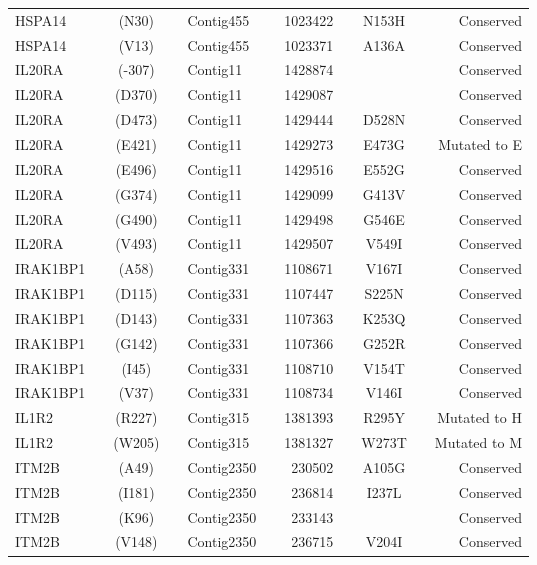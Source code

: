 \begin{center}
\begin{longtable}{lccclcrcccr}
HSPA14   & & (N30)   & & Contig455  & & 1023422  & & N153H   & & Conserved      \\
HSPA14   & & (V13)   & & Contig455  & & 1023371  & & A136A   & & Conserved      \\
IL20RA   & & (-307)  & & Contig11   & & 1428874  & &         & & Conserved      \\
IL20RA   & & (D370)  & & Contig11   & & 1429087  & &         & & Conserved      \\
IL20RA   & & (D473)  & & Contig11   & & 1429444  & & D528N   & & Conserved      \\
IL20RA   & & (E421)  & & Contig11   & & 1429273  & & E473G   & & Mutated to E   \\
IL20RA   & & (E496)  & & Contig11   & & 1429516  & & E552G   & & Conserved      \\
IL20RA   & & (G374)  & & Contig11   & & 1429099  & & G413V   & & Conserved      \\
IL20RA   & & (G490)  & & Contig11   & & 1429498  & & G546E   & & Conserved      \\
IL20RA   & & (V493)  & & Contig11   & & 1429507  & & V549I   & & Conserved      \\
IRAK1BP1 & & (A58)   & & Contig331  & & 1108671  & & V167I   & & Conserved      \\
IRAK1BP1 & & (D115)  & & Contig331  & & 1107447  & & S225N   & & Conserved      \\
IRAK1BP1 & & (D143)  & & Contig331  & & 1107363  & & K253Q   & & Conserved      \\
IRAK1BP1 & & (G142)  & & Contig331  & & 1107366  & & G252R   & & Conserved      \\
IRAK1BP1 & & (I45)   & & Contig331  & & 1108710  & & V154T   & & Conserved      \\
IRAK1BP1 & & (V37)   & & Contig331  & & 1108734  & & V146I   & & Conserved      \\
IL1R2    & & (R227)  & & Contig315  & & 1381393  & & R295Y   & & Mutated to H   \\
IL1R2    & & (W205)  & & Contig315  & & 1381327  & & W273T   & & Mutated to M   \\
ITM2B    & & (A49)   & & Contig2350 & & 230502   & & A105G   & & Conserved      \\
ITM2B    & & (I181)  & & Contig2350 & & 236814   & & I237L   & & Conserved      \\
ITM2B    & & (K96)   & & Contig2350 & & 233143   & &         & & Conserved      \\
ITM2B    & & (V148)  & & Contig2350 & & 236715   & & V204I   & & Conserved      \\

\end{longtable}
\end{center}
